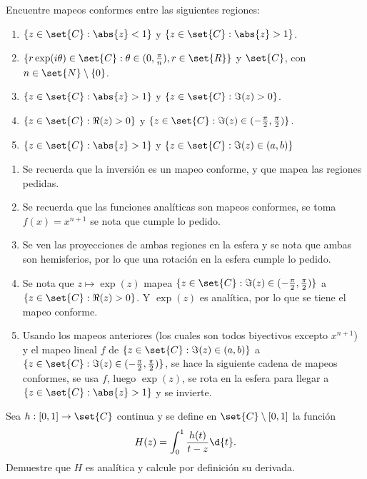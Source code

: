 \documentclass{homework}
\begin{document}
\begin{prob}
    Encuentre mapeos conformes entre las siguientes regiones:
    \begin{enumerate}[label=(\alph*)]
        \item \(\{z\in\set{C}:\abs{z}<1\}\) y \(\{z\in\set{C}:\abs{z}>1\}\).
        \item \(\{r\exp(i\theta)\in\set{C}:\theta\in(0,\frac\pi{n}),r\in\set{R}\}\) y \(\set{C}\), con \(n\in\set{N}\setminus\{0\}\).
        \item \(\{z\in\set{C}:\abs{z}>1\}\) y \(\{z\in\set{C}:\Im(z)>0\}\).
        \item \(\{z\in\set{C}:\Re(z)>0\}\) y \(\{z\in\set{C}:\Im(z)\in(-\frac\pi2,\frac\pi2)\}\).
        \item \(\{z\in\set{C}:\abs{z}>1\}\) y \(\{z\in\set{C}:\Im(z)\in(a,b)\}\)
    \end{enumerate}
\end{prob}

\begin{sol}
    \begin{enumerate}
        \item Se recuerda que la inversión es un mapeo conforme, y que mapea las regiones pedidas.
        \item Se recuerda que las funciones analíticas son mapeos conformes, se toma \(f(x)=x^{n+1}\) se nota que cumple lo pedido.
        \item Se ven las proyecciones de ambas regiones en la esfera y se nota que ambas son hemisferios, por lo que una rotación en la esfera cumple lo pedido.
        \item Se nota que \(z\mapsto\exp(z)\) mapea \(\{z\in\set{C}:\Im(z)\in(-\frac\pi2,\frac\pi2)\}\) a \(\{z\in\set{C}:\Re(z)>0\}\). Y \(\exp(z)\) es analítica, por lo que se tiene el mapeo conforme.
        \item Usando los mapeos anteriores (los cuales son todos biyectivos excepto \(x^{n+1}\)) y el mapeo lineal \(f\) de \(\{z\in\set{C}:\Im(z)\in(a,b)\}\) a \(\{z\in\set{C}:\Im(z)\in(-\frac\pi2,\frac\pi2)\}\), se hace la siguiente cadena de mapeos conformes, se usa \(f\), luego \(\exp(z)\), se rota en la esfera para llegar a \(\{z\in\set{C}:\abs{z}>1\}\) y se invierte.
    \end{enumerate}
\end{sol}

\begin{prob}
    Sea \(h:[0,1]\rightarrow\set{C}\) continua y se define en \(\set{C}\setminus[0,1]\) la función
    \[H(z)=\int_0^1\frac{h(t)}{t-z}\d{t}.\]
    Demuestre que \(H\) es analítica y calcule por definición su derivada.
\end{prob}
\end{document}
